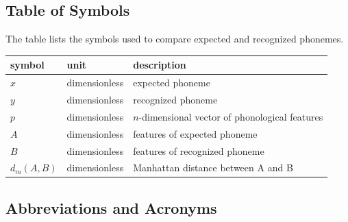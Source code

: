 \documentclass[12pt]{article}
\begin{document}
\subsection{Table of Symbols}

The table lists the symbols used to compare expected and recognized phonemes.

\renewcommand{\arraystretch}{1.2}
\noindent \begin{longtable}{l l p{}} \toprule
\textbf{symbol} & \textbf{unit} & \textbf{description}\\
\midrule 
$x$ & dimensionless & expected phoneme
\\
$y$ & dimensionless & recognized phoneme
\\
$p$ & dimensionless & $n$-dimensional vector of phonological features
\\
$A$ & dimensionless & features of expected phoneme
\\ 
$B$ & dimensionless & features of recognized phoneme
\\ 
$d_m(A,B)$ & dimensionless & Manhattan distance between A and B
\\
\bottomrule
\end{longtable}

\subsection{Abbreviations and Acronyms}
\end{document}
